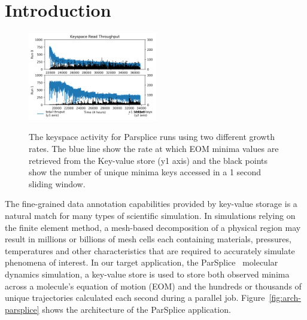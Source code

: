 \section{Introduction}


\begin{figure}[t]
  \noindent\includegraphics[width=0.5\textwidth]{figures/motivation-regimes.png}\\
  \caption{The keyspace activity for Parsplice runs using two different growth 
  rates.  The blue line show the rate at which EOM minima values are retrieved
  from the Key-value store (y1 axis) and the black points show the number of
  unique minima keys accessed in a 1 second sliding window. 
  \label{fig:motivation-regimes}}
\end{figure}

The fine-grained data annotation capabilities provided by key-value storage is
a natural match for many types of scientific simulation. In simulations relying
on the finite element method, a mesh-based decomposition of a physical region
may result in millions or billions of mesh cells each containing materials,
pressures, temperatures and other characteristics that are required to
accurately simulate phenomena of interest. In our target application, the
ParSplice~\cite{perez:jctc20150parsplice} molecular dynamics simulation, a
key-value store is used to store both observed minima across a molecule's
equation of motion (EOM) and the hundreds or thousands of unique trajectories
calculated each second during a parallel job. Figure~\ref{fig:arch-parsplice}
shows the architecture of the ParSplice application.

